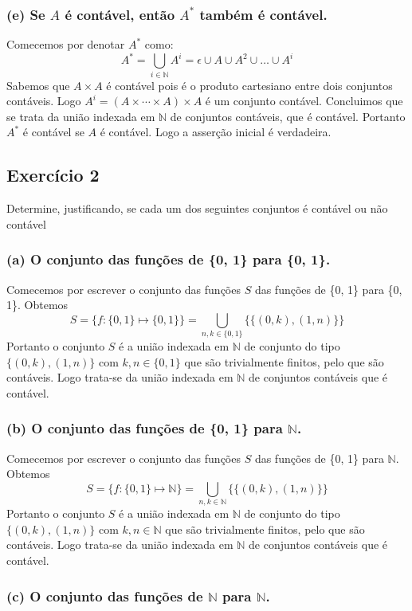 \documentclass{article}
\begin{document}
\subsubsection*{(e)  Se $A$ é contável, então $A^\ast$ também é contável.}
Comecemos por denotar $A^\ast$ como:
\[
  A^\ast = \bigcup_{i \in \mathbb{N}} A^{i} = \epsilon \cup A \cup A^2 \cup \dots \cup A^{i}
\]
Sabemos que $A \times A$ é contável pois é o produto cartesiano entre dois conjuntos contáveis. Logo $A^i = (A \times \cdots \times A) \times A$ é um conjunto contável. Concluimos que se trata da união indexada em $\mathbb{N}$ de conjuntos contáveis, que é contável. Portanto $A^\ast$ é contável se $A$ é contável. Logo a asserção inicial é verdadeira.

\subsection*{Exercício 2}
Determine, justificando, se cada um dos seguintes conjuntos é contável ou não contável
\subsubsection*{(a) O conjunto das funções de \{0, 1\} para \{0, 1\}.}
Comecemos por escrever o conjunto das funções $S$ das funções de \{0, 1\} para \{0, 1\}. Obtemos
\[
  S = \{f: \{0,1\} \mapsto \{0,1\}\} = \bigcup_{n,k \in \{0, 1\}} \{\{(0,k),(1,n)\}\}
\]
Portanto o conjunto $S$ é a união indexada em $\mathbb{N}$ de conjunto do tipo $\{(0,k),(1,n)\}$ com $k,n \in \{0, 1\}$ que são trivialmente finitos, pelo que são contáveis. Logo trata-se da união indexada em $\mathbb{N}$ de conjuntos contáveis que é contável.

\subsubsection*{(b) O conjunto das funções de \{0, 1\} para $\mathbb{N}$.}
Comecemos por escrever o conjunto das funções $S$ das funções de \{0, 1\} para $\mathbb{N}$. Obtemos
\[
  S = \{f: \{0,1\} \mapsto \mathbb{N}\} = \bigcup_{n,k \in \mathbb{N}} \{\{(0,k),(1,n)\}\}
\]
Portanto o conjunto $S$ é a união indexada em $\mathbb{N}$ de conjunto do tipo $\{(0,k),(1,n)\}$ com $k,n \in \mathbb{N}$ que são trivialmente finitos, pelo que são contáveis. Logo trata-se da união indexada em $\mathbb{N}$ de conjuntos contáveis que é contável.

\subsubsection*{(c) O conjunto das funções de $\mathbb{N}$ para $\mathbb{N}$.}
\end{document}
